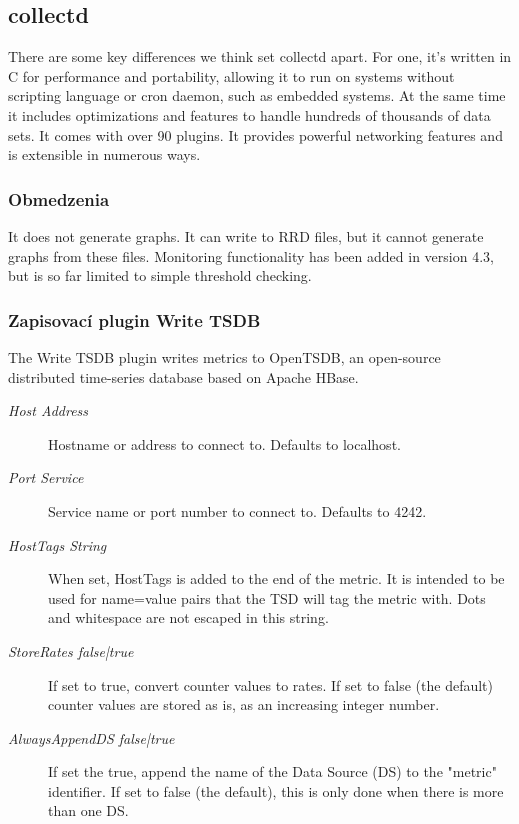 \documentclass[11pt,final,oneside]{fithesis}
\begin{document}
\subsection{collectd}
There are some key differences we think set collectd apart. For one, it's written in C for performance and portability, allowing it to run on systems without scripting language or cron daemon, such as embedded systems. 
At the same time it includes optimizations and features to handle hundreds of thousands of data sets. It comes with over 90 plugins. It provides powerful networking features and is extensible in numerous ways. 

\subsubsection{Obmedzenia}
It does not generate graphs. It can write to RRD files, but it cannot generate graphs from these files. 
Monitoring functionality has been added in version 4.3, but is so far limited to simple threshold checking. 
\cite{12}

\subsubsection{Zapisovací plugin Write TSDB}
The Write TSDB plugin writes metrics to OpenTSDB, an open-source distributed time-series database based on Apache HBase.
\cite{13}

\begin{description}
\item[\emph{Host Address}] Hostname or address to connect to. Defaults to localhost.
\item[\emph{Port Service}] Service name or port number to connect to. Defaults to 4242.
\item[\emph{HostTags String}] When set, HostTags is added to the end of the metric. It is intended to be used for name=value pairs that the TSD will tag the metric with. Dots and whitespace are not escaped in this string.
\item[\emph{StoreRates false|true}] If set to true, convert counter values to rates. If set to false (the default) counter values are stored as is, as an increasing integer number.
\item[\emph{AlwaysAppendDS false|true}] If set the true, append the name of the Data Source (DS) to the "metric" identifier. If set to false (the default), this is only done when there is more than one DS.
\end{description}
\end{document}
